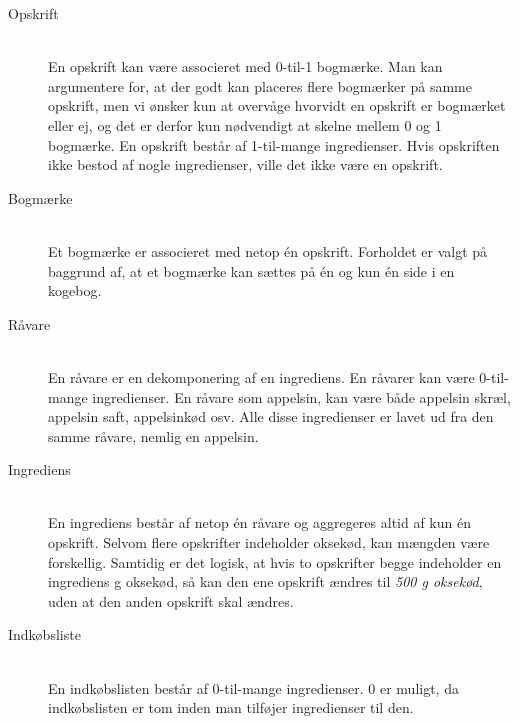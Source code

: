 \begin{description}
\item[Opskrift] \hfill \\
En opskrift kan være associeret med 0-til-1 bogmærke. Man kan argumentere for, at der godt kan placeres flere bogmærker på samme opskrift, men vi ønsker kun at overvåge hvorvidt en opskrift er bogmærket eller ej, og det er derfor kun nødvendigt at skelne mellem 0 og 1 bogmærke. En opskrift består af 1-til-mange ingredienser. Hvis opskriften ikke bestod af nogle ingredienser, ville det ikke være en opskrift.
    
\item[Bogmærke] \hfill \\
Et bogmærke er associeret med netop én opskrift. Forholdet er valgt på baggrund af, at et bogmærke kan sættes på én og kun én side i en kogebog.

\item[Råvare] \hfill \\
En råvare er en dekomponering af en ingrediens. En råvarer kan være 0-til-mange ingredienser. En råvare som \fx appelsin, kan være både appelsin skræl, appelsin saft, appelsinkød osv. Alle disse ingredienser er lavet ud fra den samme råvare, nemlig en appelsin. 

\item[Ingrediens] \hfill \\
En ingrediens består af netop én råvare og aggregeres altid af kun én opskrift. Selvom flere opskrifter indeholder oksekød, kan mængden være forskellig. Samtidig er det logisk, at hvis to opskrifter begge indeholder en ingrediens  g oksekød, så kan den ene opskrift ændres til \textit{500 g oksekød}, uden at den anden opskrift skal ændres.
  
\item[Indkøbsliste] \hfill \\
En indkøbslisten består af 0-til-mange ingredienser. 0 er muligt, da indkøbslisten er tom inden man tilføjer ingredienser til den.
\end{description}

